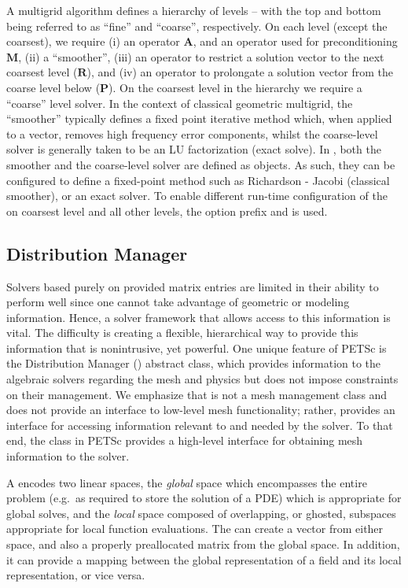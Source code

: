 \documentclass[]{siamart0216}
\newcommand{\dmat}[1]{\mathbf{#1}}
\begin{document}
A multigrid algorithm defines a hierarchy of levels -- with the top and bottom being referred to as ``fine'' 
and ``coarse'', respectively.
On each level (except the coarsest), we require 
(i) an operator $\dmat A$, and an operator used for preconditioning $\dmat M$,
(ii) a ``smoother'',
(iii) an operator to restrict a solution vector to the next coarsest level ($\dmat R$), and
(iv) an operator to prolongate a solution vector from the coarse level below ($\dmat P$).
On the coarsest level in the hierarchy we require a ``coarse'' level solver.
In the context of classical geometric multigrid, the ``smoother'' typically defines a fixed point iterative method which, 
when applied to a vector, removes high frequency error components, whilst the coarse-level solver is 
generally taken to be an LU factorization (exact solve).
In , both the smoother and the coarse-level solver are defined as  objects. 
As such, they can be configured to define a fixed-point method such as Richardson - Jacobi (classical smoother), or 
an exact solver. To enable different run-time configuration of the  on coarsest level and all other levels, the 
option prefix  and  is used.




\subsection{Distribution Manager}
Solvers based purely on provided matrix entries are limited 
in their ability to perform well since one cannot take 
advantage of geometric or modeling information. Hence, a 
solver framework that allows access to this information is 
vital. The difficulty is creating a flexible, hierarchical way 
to provide this information that is nonintrusive, yet powerful. 
One unique feature of PETSc is the Distribution Manager () 
abstract class, which provides information to the algebraic 
solvers regarding the 
mesh and physics but does not impose constraints on their 
management. We emphasize that  is not a mesh management 
class and does not provide an interface to low-level mesh 
functionality; rather,  provides an interface for accessing information 
relevant to and needed by the solver.
To that end, the  class in PETSc provides a high-level
interface for obtaining mesh information to the solver.

A  encodes two linear spaces, the \textit{global} space which encompasses
the entire problem (e.g.~as required to store the solution of a PDE) which is
appropriate for global solves, and the \textit{local} space composed of overlapping,
or ghosted, subspaces appropriate for local function evaluations. The  can
create a vector from either space, and also a properly preallocated matrix from the
global space. In addition, it can provide a mapping between the global representation
of a field and its local representation, or vice versa.
\end{document}

